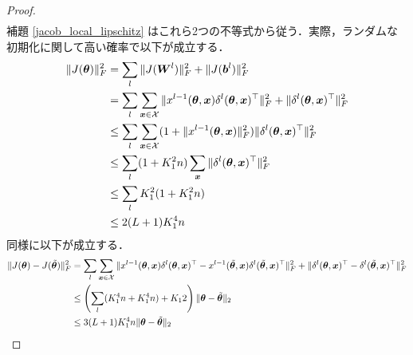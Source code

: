 \begin{proof}
\begin{align}
    \end{align}
    補題 \ref{jacob_local_lipschitz} はこれら2つの不等式から従う．実際，ランダムな初期化に関して高い確率で以下が成立する．
    \begin{align}
        \|J(\bm{\theta})\|_F^2 &= \sum_l \|J(\bm{W}^l)\|_F^2 + \|J(\bm{b}^l)\|_F^2 \\
        &= \sum_l \sum_{\bm{x} \in \mathcal{X}} \|x^{l-1}(\bm{\theta}, \bm{x})\delta^l (\bm{\theta}, \bm{x})^\top\|_F^2 + \|\delta^l (\bm{\theta}, \bm{x})^\top\|_F^2 \\
        &\leq \sum_l \sum_{\bm{x} \in \mathcal{X}} (1 + \|x^{l-1}(\bm{\theta}, \bm{x})\|_F^2)\|\delta^l (\bm{\theta}, \bm{x})^\top\|_F^2 \\
        &\leq \sum_l (1 + K_1^2 n)\sum_{\bm{x}} \|\delta^l (\bm{\theta}, \bm{x})^\top\|_F^2 \\
        &\leq \sum_l K_1^2 (1 + K_1^2 n) \\
        &\leq 2(L + 1)K_1^4 n
    \end{align}
    同様に以下が成立する．
    \begin{align}
        \|J(\bm{\theta}) - J(\tilde{\bm{\theta}})\|_F^2 &= \sum_l \sum_{\bm{x} \in \mathcal{X}} \|x^{l-1}(\bm{\theta}, \bm{x})\delta^l (\bm{\theta}, \bm{x})^\top - x^{l-1}(\tilde{\bm{\theta}}, \bm{x})\delta^l (\tilde{\bm{\theta}}, \bm{x})^\top\|_F^2 + \|\delta^l (\bm{\theta}, \bm{x})^\top - \delta^l (\tilde{\bm{\theta}}, \bm{x})^\top\|_F^2 \\
        &\leq \left(\sum_l (K_1^4 n + K_1^4 n) + K_12\right)\|\bm{\theta} - \tilde{\bm{\theta}}\|_2 \\
        &\leq 3(L + 1)K_1^4 n\|\bm{\theta} - \tilde{\bm{\theta}}\|_2
    \end{align}
\end{proof}